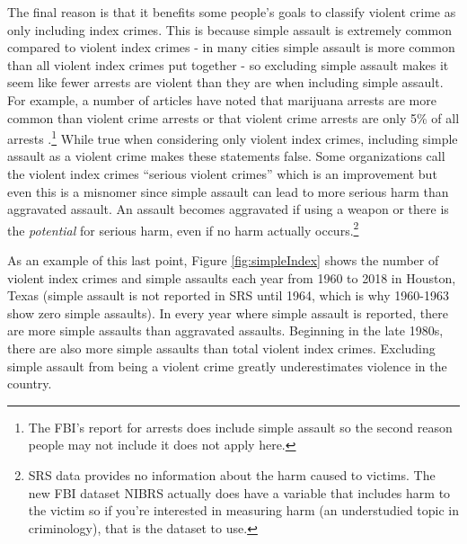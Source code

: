 \documentclass[
  12pt,
  openany]{book}
\begin{document}
The final reason is that it benefits some people's goals to classify violent crime as only including index crimes. This is because simple assault is extremely common compared to violent index crimes - in many cities simple assault is more common than all violent index crimes put together - so excluding simple assault makes it seem like fewer arrests are violent than they are when including simple assault. For example, a number of articles have noted that marijuana arrests are more common than violent crime arrests \citep{ingraham2016, kertscher2019, devito2020, earlenbaugh2020, aclu2020} or that violent crime arrests are only 5\% of all arrests \citep{neusteter2019every, speri2019}.\footnote{The FBI's report for arrests does include simple assault so the second reason people may not include it does not apply here.} While true when considering only violent index crimes, including simple assault as a violent crime makes these statements false. Some organizations call the violent index crimes ``serious violent crimes'' which is an improvement but even this is a misnomer since simple assault can lead to more serious harm than aggravated assault. An assault becomes aggravated if using a weapon or there is the \emph{potential} for serious harm, even if no harm actually occurs.\footnote{SRS data provides no information about the harm caused to victims. The new FBI dataset NIBRS actually does have a variable that includes harm to the victim so if you're interested in measuring harm (an understudied topic in criminology), that is the dataset to use.}

As an example of this last point, Figure \ref{fig:simpleIndex} shows the number of violent index crimes and simple assaults each year from 1960 to 2018 in Houston, Texas (simple assault is not reported in SRS until 1964, which is why 1960-1963 show zero simple assaults). In every year where simple assault is reported, there are more simple assaults than aggravated assaults. Beginning in the late 1980s, there are also more simple assaults than total violent index crimes. Excluding simple assault from being a violent crime greatly underestimates violence in the country.
\end{document}
